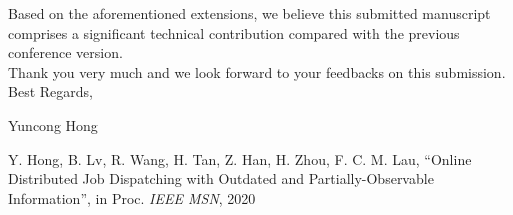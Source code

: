 \documentclass[10pt,draftclsnofoot,onecolumn]{article}
\begin{document}
\begin{enumerate}
\end{enumerate}

Based on the aforementioned extensions, we believe this submitted manuscript comprises a significant technical contribution compared with the previous conference version.\\

Thank you very much and we look forward to your feedbacks on this submission.\\

Best Regards,

Yuncong Hong
\vspace{+20mm}

\noindent [1] Y. Hong, B. Lv, R. Wang, H. Tan, Z. Han, H. Zhou, F. C. M. Lau, ``Online Distributed Job Dispatching with Outdated and Partially-Observable Information'', in Proc. \emph{IEEE MSN}, 2020\\
\end{document}
